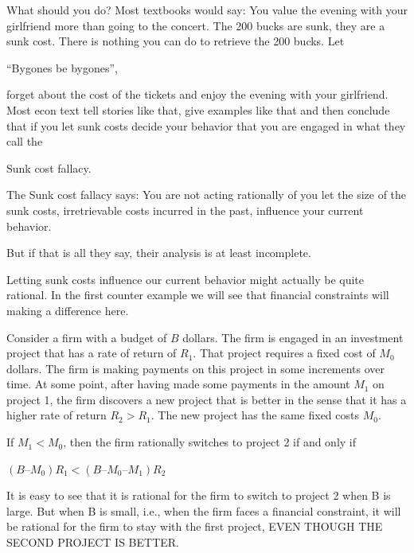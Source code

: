 \documentclass[
]{book}
\begin{document}
What should you do? Most textbooks would say: You value the evening with your girlfriend more than going to the concert. The 200 bucks are sunk, they are a sunk cost. There is nothing you can do to retrieve the 200 bucks. Let

\begin{center}
``Bygones be bygones'',

\end{center}

forget about the cost of the tickets and enjoy the evening with your girlfriend.
Most econ text tell stories like that, give examples like that and then conclude that if you let sunk costs decide your behavior that you are engaged in what they call the

\begin{center}
Sunk cost fallacy.

\end{center}

The Sunk cost fallacy says: You are not acting rationally of you let the size of the sunk costs, irretrievable costs incurred in the past, influence your current behavior.

But if that is all they say, their analysis is at least incomplete.

Letting sunk costs influence our current behavior might actually be quite rational. In the first counter example we will see that financial constraints will making a difference here.

Consider a firm with a budget of \(B\) dollars. The firm is engaged in an investment project that has a rate of return of \(R_1\). That project requires a fixed cost of \(M_0\) dollars. The firm is making payments on this project in some increments over time. At some point, after having made some payments in the amount \(M_1\) on project 1, the firm discovers a new project that is better in the sense that it has a higher rate of return \(R_2 > R_1\). The new project has the same fixed costs \(M_0\).

If \(M_1 < M_0\), then the firm rationally switches to project 2 if and only if

\begin{center}
\((B – M_0) R_1 < (B – M_0 – M_1) R_2\)

\end{center}

It is easy to see that it is rational for the firm to switch to project 2 when B is large. But when B is small, i.e., when the firm faces a financial constraint, it will be rational for the firm to stay with the first project, EVEN THOUGH THE SECOND PROJECT IS BETTER.
\end{document}
